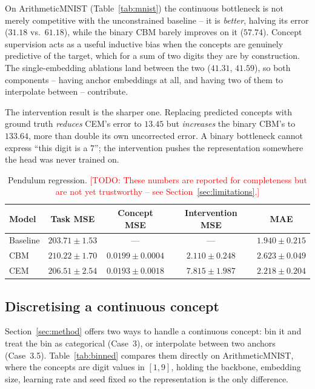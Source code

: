 \documentclass[11pt]{article}
\newcommand{\todo}[1]{\textcolor{red}{[TODO: #1]}}
\begin{document}
On ArithmeticMNIST (Table~\ref{tab:mnist}) the continuous bottleneck is not
merely competitive with the unconstrained baseline -- it is \emph{better},
halving its error ($31.18$ vs.\ $61.18$), while the binary CBM barely improves
on it ($57.74$). Concept supervision acts as a useful inductive bias when the
concepts are genuinely predictive of the target, which for a sum of two digits
they are by construction. The single-embedding ablations land between the two
($41.31$, $41.59$), so both components -- having anchor embeddings at all, and
having two of them to interpolate between -- contribute.

The intervention result is the sharper one. Replacing predicted concepts with
ground truth \emph{reduces} CEM's error to $13.45$ but \emph{increases} the
binary CBM's to $133.64$, more than double its own uncorrected error. A binary
bottleneck cannot express ``this digit is a 7''; the intervention pushes the
representation somewhere the head was never trained on.

\begin{table}[t]
\centering
\caption{Pendulum regression. \todo{These numbers are reported for
completeness but are not yet trustworthy -- see Section~\ref{sec:limitations}.}}
\label{tab:pendulum}
\begin{tabular}{lcccc}
\toprule
\textbf{Model} & \textbf{Task MSE} & \textbf{Concept MSE} &
\textbf{Intervention MSE} & \textbf{MAE} \\
\midrule
Baseline & $\mathbf{203.71 \pm 1.53}$ & --- & --- & $\mathbf{1.940 \pm 0.215}$ \\
CBM      & $210.22 \pm 1.70$ & $0.0199 \pm 0.0004$ & $\mathbf{2.110 \pm 0.248}$ & $2.623 \pm 0.049$ \\
CEM      & $206.51 \pm 2.54$ & $\mathbf{0.0193 \pm 0.0018}$ & $7.815 \pm 1.987$ & $2.218 \pm 0.204$ \\
\bottomrule
\end{tabular}
\end{table}

\subsection{Discretising a continuous concept}
\label{sec:binning}

Section~\ref{sec:method} offers two ways to handle a continuous concept: bin it
and treat the bin as categorical (Case~3), or interpolate between two anchors
(Case~3.5). Table~\ref{tab:binned} compares them directly on ArithmeticMNIST,
where the concepts are digit values in $[1,9]$, holding the backbone, embedding
size, learning rate and seed fixed so the representation is the only
difference.
\end{document}
